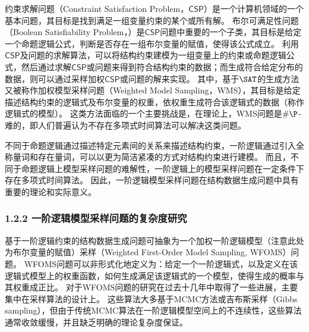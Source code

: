 \documentclass[12pt,UTF8,AutoFakeBold=3,a4paper]{ctexart} %
\newcommand{\CSP}{\ensuremath{\mathsf{CSP}}}
\begin{document}
约束求解问题（Constraint Satisfaction Problem，\CSP{}）是一个计算机领域的一个基本问题，其目标是找到满足一组变量约束的某个或所有解。
布尔可满足性问题（Boolean Satisfiability Problem，\SAT）是\CSP{}问题中重要的一个子类，其目标是给定一个命题逻辑公式，判断是否存在一组布尔变量的赋值，使得该公式成立。
利用\CSP{}及\SAT{}问题的求解算法，可以将结构约束建模为一组变量上的约束或命题逻辑公式，然后通过求解\CSP{}或\SAT{}问题来得到符合结构约束的数据；而生成符合给定分布的数据，则可以通过采样加权\CSP{}或\SAT{}问题的解来实现。
其中，基于$\SAT$的生成方法又被称作加权模型采样问题（Weighted Model Sampling，WMS），其目标是给定描述结构约束的逻辑式及布尔变量的权重，依权重生成符合该逻辑式的数据（称作逻辑式的模型）。
这类方法面临的一个主要挑战是，在理论上，WMS问题是$\#\P$-难的，即人们普遍认为不存在多项式时间算法可以解决这类问题。

不同于命题逻辑通过描述特定元素间的关系来描述结构约束，一阶逻辑通过引入全称量词和存在量词，可以以更为简洁紧凑的方式对结构约束进行建模。
而且，不同于命题逻辑上模型采样问题的难解性，一阶逻辑上的模型采样问题在一定条件下存在多项式时间算法。
因此，一阶逻辑模型采样问题在结构数据生成问题中具有重要的理论和实际意义。

\subsubsection{1.2.2 一阶逻辑模型采样问题的复杂度研究}

基于一阶逻辑约束的结构数据生成问题可抽象为一个加权一阶逻辑模型（注意此处为布尔变量的赋值）采样（Weighted First-Order Model Sampling, WFOMS）问题。
WFOMS问题可以非形式化地定义为：给定一个一阶逻辑式，以及定义在该逻辑式模型上的权重函数，如何生成满足该逻辑式的一个模型，使得生成的概率与其权重成正比。
对于WFOMS问题的研究在过去十几年中取得了一些进展，主要集中在采样算法的设计上。
这些算法大多基于MCMC方法或吉布斯采样（Gibbs sampling），但由于传统MCMC算法在一阶逻辑模型空间上的不连续性，这些算法通常收敛缓慢，并且缺乏明确的理论复杂度保证。
\end{document}
